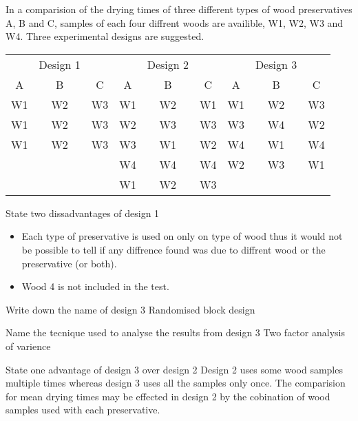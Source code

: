         \begin{example}
            {
                In a comparision of the drying times of three different types of wood preservatives A, B and C, samples of each four diffrent woods are availible, W1, W2, W3 and W4. Three experimental designs are suggested.
                \begin{center}
                \begin{tabular}{ccc|ccc|ccc}
                & Design 1 & & & Design 2 & & & Design 3 & \\
                A & B & C & A & B & C & A & B & C \\
                \hline
                W1 & W2 & W3 & W1 & W2 & W1 & W1 & W2 & W3 \\
                W1 & W2 & W3 & W2 & W3 & W3 & W3 & W4 & W2 \\
                W1 & W2 & W3 & W3 & W1 & W2 & W4 & W1 & W4 \\
                &    &    & W4 & W4 & W4 & W2 & W3 & W1 \\
                &    &    & W1 & W2 & W3 &    &    &    \\
                \end{tabular}
                \end{center}
            }

            \begin{step}{State two dissadvantages of design 1}
            \begin{itemize}
            \item Each type of preservative is used on only on type of wood thus it would not be possible to tell if any diffrence found was due to diffrent wood or the preservative (or both).
            \item Wood 4 is not included in the test.
            \end{itemize}
            \end{step}

            \begin{step}{Write down the name of design 3}
            Randomised block design
            \end{step}

            \begin{step}{Name the tecnique used to analyse the results from design 3}
            Two factor analysis of varience
            \end{step}

            \begin{step}{State one advantage of design 3 over design 2}
            Design 2 uses some wood samples multiple times whereas design 3 uses all the samples only once. The comparision for mean drying times may be effected in design 2 by the cobination of wood samples used with each preservative.
            \end{step}


\end{example}
